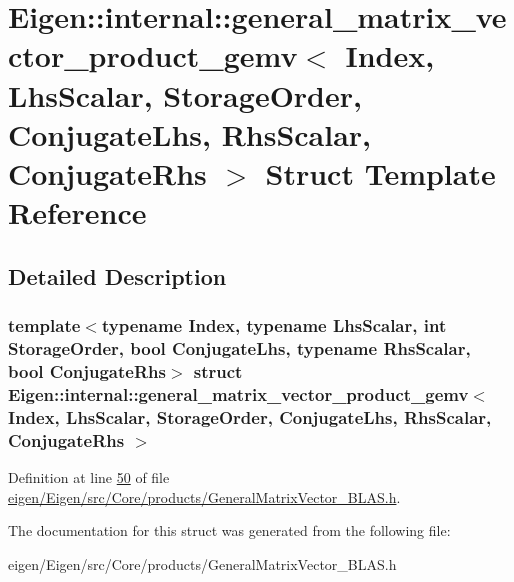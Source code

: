 \hypertarget{struct_eigen_1_1internal_1_1general__matrix__vector__product__gemv}{}\section{Eigen\+:\+:internal\+:\+:general\+\_\+matrix\+\_\+vector\+\_\+product\+\_\+gemv$<$ Index, Lhs\+Scalar, Storage\+Order, Conjugate\+Lhs, Rhs\+Scalar, Conjugate\+Rhs $>$ Struct Template Reference}
\label{struct_eigen_1_1internal_1_1general__matrix__vector__product__gemv}


\subsection{Detailed Description}
\subsubsection*{template$<$typename Index, typename Lhs\+Scalar, int Storage\+Order, bool Conjugate\+Lhs, typename Rhs\+Scalar, bool Conjugate\+Rhs$>$\newline
struct Eigen\+::internal\+::general\+\_\+matrix\+\_\+vector\+\_\+product\+\_\+gemv$<$ Index, Lhs\+Scalar, Storage\+Order, Conjugate\+Lhs, Rhs\+Scalar, Conjugate\+Rhs $>$}



Definition at line \hyperlink{eigen_2_eigen_2src_2_core_2products_2_general_matrix_vector___b_l_a_s_8h_source_l00050}{50} of file \hyperlink{eigen_2_eigen_2src_2_core_2products_2_general_matrix_vector___b_l_a_s_8h_source}{eigen/\+Eigen/src/\+Core/products/\+General\+Matrix\+Vector\+\_\+\+B\+L\+A\+S.\+h}.



The documentation for this struct was generated from the following file\+:\begin{DoxyCompactItemize}
\item 
eigen/\+Eigen/src/\+Core/products/\+General\+Matrix\+Vector\+\_\+\+B\+L\+A\+S.\+h\end{DoxyCompactItemize}

